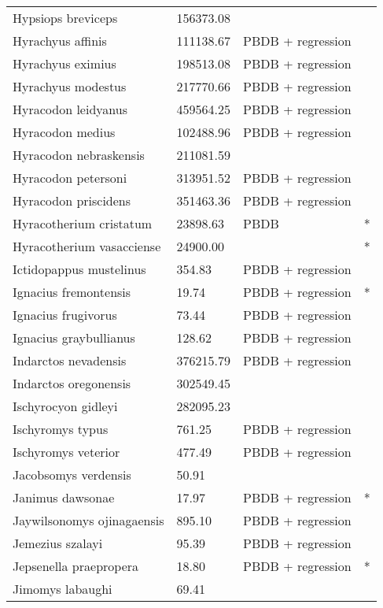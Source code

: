 \documentclass{article}
\begin{document}
\begin{center}
\begin{longtable}{p{} p{} p{} p{}}
    Hypsiops breviceps & 156373.08 & \cite{Tomiya2013} &  \\ 
    Hyrachyus affinis & 111138.67 & PBDB + regression &  \\ 
    Hyrachyus eximius & 198513.08 & PBDB + regression &  \\ 
    Hyrachyus modestus & 217770.66 & PBDB + regression &  \\ 
    Hyracodon leidyanus & 459564.25 & PBDB + regression &  \\ 
    Hyracodon medius & 102488.96 & PBDB + regression &  \\ 
    Hyracodon nebraskensis & 211081.59 & \cite{Tomiya2013} &  \\ 
    Hyracodon petersoni & 313951.52 & PBDB + regression &  \\ 
    Hyracodon priscidens & 351463.36 & PBDB + regression &  \\ 
    Hyracotherium cristatum & 23898.63 & PBDB & * \\ 
    Hyracotherium vasacciense & 24900.00 & \cite{MacFadden1986} & * \\ 
    Ictidopappus mustelinus & 354.83 & PBDB + regression &  \\ 
    Ignacius fremontensis & 19.74 & PBDB + regression & * \\ 
    Ignacius frugivorus & 73.44 & PBDB + regression &  \\ 
    Ignacius graybullianus & 128.62 & PBDB + regression &  \\ 
    Indarctos nevadensis & 376215.79 & PBDB + regression &  \\ 
    Indarctos oregonensis & 302549.45 & \cite{Tomiya2013} &  \\ 
    Ischyrocyon gidleyi & 282095.23 & \cite{Tomiya2013} &  \\ 
    Ischyromys typus & 761.25 & PBDB + regression &  \\ 
    Ischyromys veterior & 477.49 & PBDB + regression &  \\ 
    Jacobsomys verdensis & 50.91 & \cite{Tomiya2013} &  \\ 
    Janimus dawsonae & 17.97 & PBDB + regression & * \\ 
    Jaywilsonomys ojinagaensis & 895.10 & PBDB + regression &  \\ 
    Jemezius szalayi & 95.39 & PBDB + regression &  \\ 
    Jepsenella praepropera & 18.80 & PBDB + regression & * \\ 
    Jimomys labaughi & 69.41 & \cite{Tomiya2013} &  \\ 

\end{longtable}
\end{center}
\end{document}
